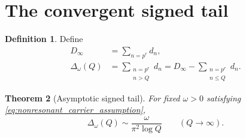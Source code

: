 \documentclass[11pt]{amsart}
\numberwithin{equation}{section}
\theoremstyle{plain}
\newtheorem{theorem}{Theorem}[section]
\theoremstyle{definition}
\newtheorem{definition}[theorem]{Definition}
\theoremstyle{remark}
\newcommand{\1}{\mathbf{1}}
\begin{document}
\section{The convergent signed tail}
\label{sec:signed_tail}

\begin{definition}
\label{def:Delta}
Define
\begin{align}
D_\infty
&=
\sum_{n=p^r}d_n,
\label{eq:D_infinity}
\\
\Delta_\omega(Q)
&=
\sum_{\substack{n=p^r\\n>Q}}d_n
=
D_\infty-\sum_{\substack{n=p^r\\n\leq Q}}d_n.
\label{eq:Delta_definition}
\end{align}
\end{definition}

\begin{theorem}[Asymptotic signed tail]
\label{thm:Delta_asymptotic}
For fixed \(\omega>0\) satisfying
\eqref{eq:nonresonant_carrier_assumption},
\begin{equation}
\boxed{
\Delta_\omega(Q)
\sim
\frac{\omega}{\pi^2\log Q}
\qquad(Q\to\infty).
}
\label{eq:Delta_asymptotic}
\end{equation}
\end{theorem}
\end{document}
